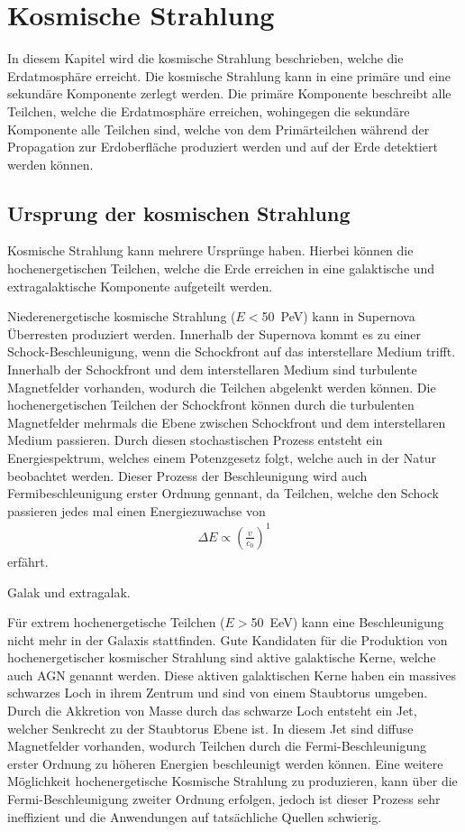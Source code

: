 \thispagestyle{plain}
\chapter{Kosmische Strahlung}
In diesem Kapitel wird die kosmische Strahlung beschrieben, welche die Erdatmosphäre erreicht. Die kosmische Strahlung kann in eine primäre und eine sekundäre Komponente zerlegt werden. Die primäre Komponente beschreibt alle Teilchen, welche die Erdatmosphäre erreichen, wohingegen die sekundäre Komponente alle Teilchen sind, welche von dem Primärteilchen während der Propagation zur Erdoberfläche produziert werden und auf der Erde detektiert werden können.
\section{Ursprung der kosmischen Strahlung}
Kosmische Strahlung kann mehrere Ursprünge haben. Hierbei können die hochenergetischen Teilchen, welche die Erde erreichen in eine galaktische und extragalaktische Komponente aufgeteilt werden.

Niederenergetische kosmische Strahlung ($E<$\SI{50}{PeV}) kann in Supernova Überresten produziert werden. Innerhalb der Supernova kommt es zu einer Schock-Beschleunigung, wenn die Schockfront auf das interstellare Medium trifft.  Innerhalb der Schockfront und dem interstellaren Medium sind turbulente Magnetfelder vorhanden, wodurch die Teilchen abgelenkt werden können. Die hochenergetischen Teilchen der Schockfront können durch die turbulenten Magnetfelder mehrmals die Ebene zwischen Schockfront und dem interstellaren Medium passieren. Durch diesen stochastischen Prozess entsteht ein Energiespektrum, welches einem Potenzgesetz folgt, welche auch in der Natur beobachtet werden. Dieser Prozess der Beschleunigung wird auch Fermibeschleunigung erster Ordnung gennant, da Teilchen, welche den Schock passieren jedes mal einen Energiezuwachse von 
\begin{align}
\Delta E \propto \left(\frac{v}{c_0}\right)^1
\end{align}
erfährt.


Galak und extragalak.

Für extrem hochenergetische Teilchen ($E>$\SI{50}{EeV}) kann eine Beschleunigung nicht mehr in der Galaxis stattfinden. Gute Kandidaten für die Produktion von hochenergetischer kosmischer Strahlung sind aktive galaktische Kerne, welche auch AGN genannt werden. Diese aktiven galaktischen Kerne haben ein massives schwarzes Loch in ihrem Zentrum und sind von einem Staubtorus umgeben. Durch die Akkretion von Masse durch das schwarze Loch entsteht ein Jet, welcher Senkrecht zu der Staubtorus Ebene ist. In diesem Jet sind diffuse Magnetfelder vorhanden, wodurch Teilchen durch die Fermi-Beschleunigung erster Ordnung zu höheren Energien beschleunigt werden können. Eine weitere Möglichkeit hochenergetische Kosmische Strahlung zu produzieren, kann über die Fermi-Beschleunigung zweiter Ordnung erfolgen, jedoch ist dieser Prozess sehr ineffizient und die Anwendungen auf tatsächliche Quellen schwierig.




